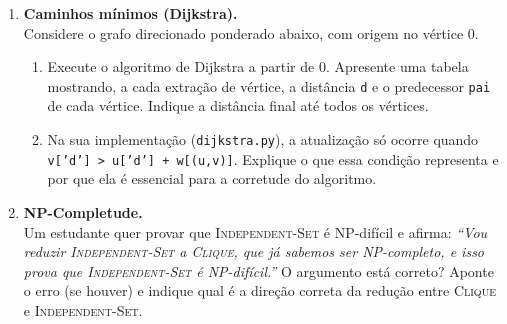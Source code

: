 \documentclass[10pt,a4paper]{extarticle}
\begin{document}
\begin{enumerate}[label=\textbf{\arabic*.}, itemsep=0.7cm, leftmargin=*]
\item \textbf{Caminhos mínimos (Dijkstra).} \\
Considere o grafo direcionado ponderado abaixo, com origem no vértice $0$.

\begin{center}
\end{center}

\begin{enumerate}[label=(\alph*)]
    \item Execute o algoritmo de Dijkstra a partir de $0$. Apresente uma tabela mostrando, a cada extração de vértice, a distância \texttt{d} e o predecessor \texttt{pai} de cada vértice. Indique a distância final até todos os vértices.
    \item Na sua implementação (\texttt{dijkstra.py}), a atualização só ocorre quando \texttt{v['d'] > u['d'] + w[(u,v)]}. Explique o que essa condição representa e por que ela é essencial para a corretude do algoritmo.
\end{enumerate}

\item \textbf{NP-Completude.} \\
Um estudante quer provar que \textsc{Independent-Set} é NP-difícil e afirma: \textit{``Vou reduzir \textsc{Independent-Set} a \textsc{Clique}, que já sabemos ser NP-completo, e isso prova que \textsc{Independent-Set} é NP-difícil.''} O argumento está correto? Aponte o erro (se houver) e indique qual é a direção correta da redução entre \textsc{Clique} e \textsc{Independent-Set}.


\end{enumerate}
\end{document}
